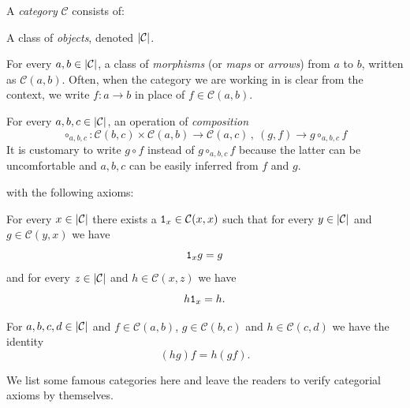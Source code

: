 \begin{definition}[Categories]\label{definition:categories}
  A {\em category} \(\mathcal{C}\) consists of:
  \begin{tcbitem}
  \item A class of {\em objects}, denoted \(\left\lvert\mathcal{C}\right\rvert\).
  \item For every \(a, b \in \left\lvert\mathcal{C}\right\rvert\), a class of {\em morphisms}
    (or {\em maps} or {\em arrows}) from \(a\) to \(b\), written as
    \(\mathcal{C}(a, b)\). Often, when the category we are working in is
    clear from the context, we write \(f : a \to b\) in place of
    \(f \in \mathcal{C}(a, b)\).
  \item For every \(a, b, c \in \left\lvert\mathcal{C}\right\rvert\), an operation of {\em
      composition}
    \[
      \circ_{a, b, c} : \mathcal{C}(b, c) \times \mathcal{C}(a, b) \to \mathcal{C}(a, c) \,, \ (g,
      f) \to g \circ_{a, b, c} f
    \]
    It is customary to write \(g \circ f\) instead of
    \(g \circ_{a, b, c} f\) because the latter can be uncomfortable and
    \(a, b, c\) can be easily inferred from \(f\) and \(g\).
  \end{tcbitem}
  with the following axioms:
  \begin{tcbenum}
  \item For every \(x \in \left\lvert\mathcal{C}\right\rvert\) there exists a
    \(\mathtt 1_x \in \mathcal{C}(x, x)\) such that for every
    \(y \in \left\lvert\mathcal{C}\right\rvert\) and \(g \in \mathcal{C}(y, x)\) we have
    \[
      \mathtt 1_x g = g
    \]
    and for every \(z \in \left\lvert\mathcal{C}\right\rvert\) and \(h \in \mathcal{C}(x, z)\) we have
    \[
      h \mathtt 1_x = h .
    \]
  \item For \(a, b, c, d \in \left\lvert\mathcal{C}\right\rvert\) and \(f \in \mathcal{C}(a, b)\),
    \(g \in \mathcal{C}(b, c)\) and \(h \in \mathcal{C}(c, d)\) we have the identity
    \[
      (h g) f = h (g f) .
    \]
  \end{tcbenum}
\end{definition}

We list some famous categories here and leave the readers to verify
categorial axioms by themselves.

